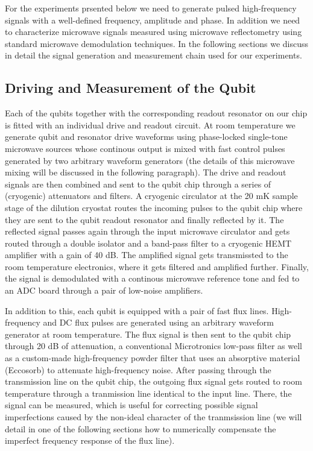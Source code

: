 For the experiments prsented below we need to generate pulsed high-frequency signals with a well-defined frequency, amplitude and phase. In addition we need to characterize microwave signals measured using microwave reflectometry using standard microwave demodulation techniques. In the following sections we discuss in detail the signal generation and measurement chain used for our experiments.

\subsection{Driving and Measurement of the Qubit}

Each of the qubits together with the corresponding readout resonator on our chip is fitted with an individual drive and readout circuit. At room temperature we generate qubit and resonator drive waveforms using phase-locked single-tone microwave sources whose continous output is mixed with fast control pulses generated by two arbitrary waveform generators (the details of this microwave mixing will be discussed in the following paragraph). The drive and readout signals are then combined and sent to the qubit chip through a series of (cryogenic) attenuators and filters. A cryogenic circulator at the 20 mK sample stage of the dilution cryostat routes the incoming pulses to the qubit chip where they are sent to the qubit readout resonator and finally reflected by it. The reflected signal passes again through the input microwave circulator and gets routed through a double isolator and a band-pass filter to a cryogenic HEMT amplifier with a gain of 40 dB. The amplified signal gets transmissted to the room temperature electronics, where it gets filtered and amplified further. Finally, the signal is demodulated with a continous microwave reference tone and fed to an ADC board through a pair of low-noise amplifiers.

\smallskip

In addition to this, each qubit is equipped with a pair of fast flux lines. High-frequency and DC flux pulses are generated using an arbitrary waveform generator at room temperature. The flux signal is then sent to the qubit chip through 20 dB of attenuation, a conventional Microtronics low-pass filter as well as a custom-made high-frequency powder filter that uses an absorptive material (Eccosorb) to attenuate high-frequency noise. After passing through the transmission line on the qubit chip, the outgoing flux signal gets routed to room temperature through a tranmission line identical to the input line. There, the signal can be measured, which is useful for correcting possible signal imperfections caused by the non-ideal character of the tranmsission line (we will detail in one of the following sections how to numerically compensate the imperfect frequency response of the flux line).

